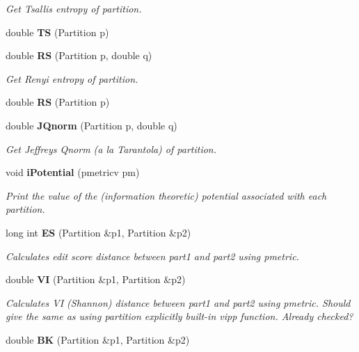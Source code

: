 \begin{CompactItemize}
\begin{CompactList}\small\item\em Get Tsallis entropy of partition. \item\end{CompactList}\item 
double {\bf TS} (Partition p)\label{classPartitionStats_a30}

\item 
double {\bf RS} (Partition p, double q)\label{classPartitionStats_a31}

\begin{CompactList}\small\item\em Get Renyi entropy of partition. \item\end{CompactList}\item 
double {\bf RS} (Partition p)\label{classPartitionStats_a32}

\item 
double {\bf JQnorm} (Partition p, double q)\label{classPartitionStats_a33}

\begin{CompactList}\small\item\em Get Jeffreys Qnorm (a la Tarantola) of partition. \item\end{CompactList}\item 
void {\bf i\-Potential} (pmetricv pm)\label{classPartitionStats_a34}

\begin{CompactList}\small\item\em Print the value of the (information theoretic) potential associated with each partition. \item\end{CompactList}\item 
long int {\bf ES} (Partition \&p1, Partition \&p2)\label{classPartitionStats_a35}

\begin{CompactList}\small\item\em Calculates edit score distance between part1 and part2 using pmetric. \item\end{CompactList}\item 
double {\bf VI} (Partition \&p1, Partition \&p2)\label{classPartitionStats_a36}

\begin{CompactList}\small\item\em Calculates VI (Shannon) distance between part1 and part2 using pmetric. Should give the same as using partition explicitly built-in vipp function. Already checked? \item\end{CompactList}\item 
double {\bf BK} (Partition \&p1, Partition \&p2)\label{classPartitionStats_a37}


\end{CompactItemize}
